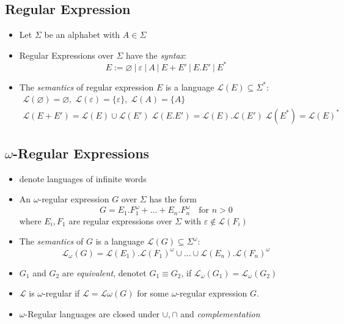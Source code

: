 \documentclass[a4paper, 10pt]{article}
\begin{document}
\subsection*{Regular Expression}
\begin{shaded}
\begin{itemize}
    \item Let $\Sigma$ be an alphabet with $A\in\Sigma$
    \item Regular Expressions over $\Sigma$ have the \emph{syntax}:
    \[ E:=\varnothing \ | \ \varepsilon \ | \ A \ | \ E+E'\ | \ E.E'\ | \ E^* \]
    \item The \emph{semantics} of regular expression $E$ is a language $\mathcal{L}(E)\subseteq \Sigma^*$:
    \begin{align*}
    \mathcal{L}(\varnothing) = \varnothing, \; \mathcal{L}(\varepsilon)=\{\varepsilon\},\; \mathcal{L}(A)=\{A\} \\
    \mathcal{L}(E+E') = \mathcal{L}(E)\cup\mathcal{L}(E') \; \mathcal{L}(E.E')=\mathcal{L}(E).\mathcal{L}(E') \; \mathcal{L}(E^*)=\mathcal{L}(E)^*
    \end{align*}
\end{itemize}
\end{shaded}

\subsection*{$\omega$-Regular Expressions}
\begin{shaded}
\begin{itemize}
    \item denote languages of infinite words
    \item An $\omega$-regular expression $G$ over $\Sigma$ has the form
    \[ G=E_1.F_1^\omega + \dots + E_n.F_n^\omega \quad \textrm{for } n>0 \]
    where $E_i,F_1$ are regular expressions over $\Sigma$ with $\varepsilon \not\in\mathcal{L}(F_i)$
    \item The \emph{semantics} of $G$ is a language $\mathcal{L}(G)\subseteq\Sigma^\omega$:
    \[\mathcal{L}_\omega(G)=\mathcal{L}(E_1).\mathcal{L}(F_1)^\omega \cup\dots\cup \mathcal{L}(E_n).\mathcal{L}(F_n)^\omega \]
    \item $G_1$ and $G_2$ are \emph{equivalent}, denotet $G_1\equiv G_2$, if $\mathcal{L}_\omega(G_1)=\mathcal{L}_\omega(G_2)$
    \item $\mathcal{L}$ is $\omega$-regular if $\mathcal{L}=\mathcal{L}\omega(G)$ for some $\omega$-regular expression $G$.
    \item $\omega$-Regular languages are closed under $\cup,\cap$ and \emph{complementation}
\end{itemize}
\end{shaded}
\end{document}
